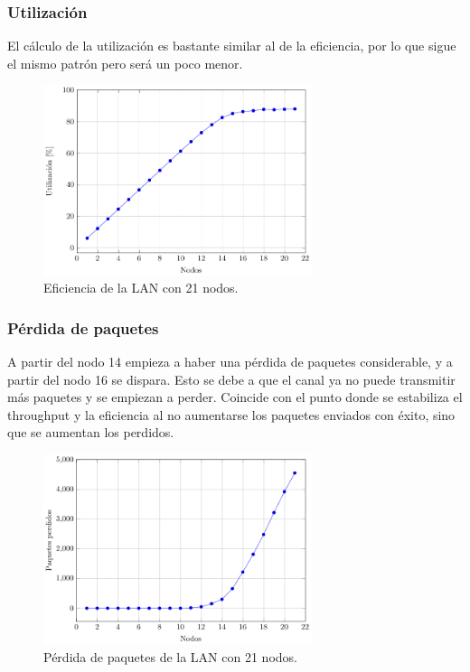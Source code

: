 \documentclass{article}
\begin{document}
\subsubsection{Utilización}

El cálculo de la utilización es bastante similar al de la eficiencia, por lo que sigue el mismo patrón pero será un poco menor.

\begin{figure}[h]
    \centering
    \includegraphics[width=0.7\textwidth]{src/Utilization.pdf}
    \caption{Eficiencia de la LAN con 21 nodos.}
\end{figure}

\subsubsection{Pérdida de paquetes}

A partir del nodo 14 empieza a haber una pérdida de paquetes considerable, y a partir del nodo 16 se dispara. Esto se debe a que el canal ya no puede transmitir más paquetes y se empiezan a perder. Coincide con el punto donde se estabiliza el throughput y la eficiencia al no aumentarse los paquetes enviados con éxito, sino que se aumentan los perdidos.

\begin{figure}[h]
    \centering
    \includegraphics[width=0.7\textwidth]{src/Dropped.pdf}
    \caption{Pérdida de paquetes de la LAN con 21 nodos.}
\end{figure}
\end{document}
